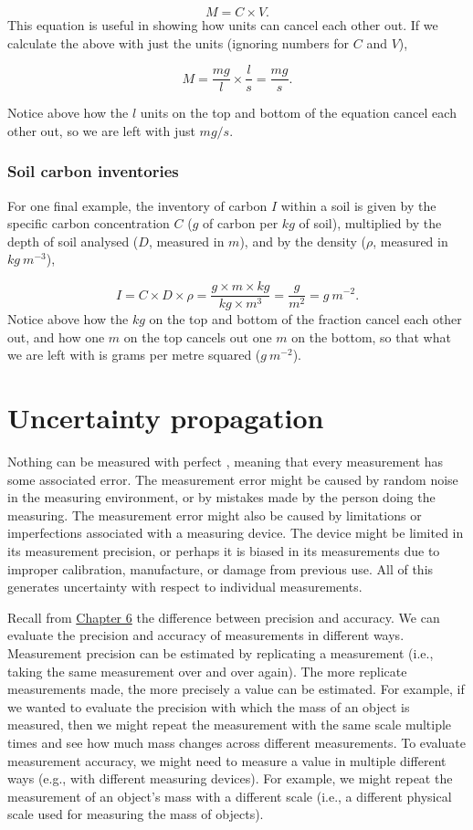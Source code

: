 \documentclass[
  openany]{krantz}
\begin{document}
\[M = C \times V.\]
This equation is useful in showing how units can cancel each other out.
If we calculate the above with just the units (ignoring numbers for \(C\) and \(V\)),

\[M = \frac{mg}{l} \times \frac{l}{s} = \frac{mg}{s}.\]

Notice above how the \(l\) units on the top and bottom of the equation cancel each other out, so we are left with just \(mg/s\).

\hypertarget{soil-carbon-inventories}{%
\subsection{Soil carbon inventories}\label{soil-carbon-inventories}}

For one final example, the inventory of carbon \(I\) within a soil is given by the specific carbon concentration \(C\) (\(g\) of carbon per \(kg\) of soil), multiplied by the depth of soil analysed (\(D\), measured in \(m\)), and by the density (\(\rho\), measured in \(kg\:m^{-3}\)),

\[I = C \times D \times \rho = \frac{g\times m \times kg}{kg \times m^{3}} = \frac{g}{m^{2}} = g\:m^{-2}.\]
Notice above how the \(kg\) on the top and bottom of the fraction cancel each other out, and how one \(m\) on the top cancels out one \(m\) on the bottom, so that what we are left with is grams per metre squared (\(g\:m^{-2}\)).

\hypertarget{Chapter_7}{%
\chapter{Uncertainty propagation}\label{Chapter_7}}

Nothing can be measured with perfect , meaning that every measurement has some associated error.
The measurement error might be caused by random noise in the measuring environment, or by mistakes made by the person doing the measuring.
The measurement error might also be caused by limitations or imperfections associated with a measuring device.
The device might be limited in its measurement precision, or perhaps it is biased in its measurements due to improper calibration, manufacture, or damage from previous use.
All of this generates uncertainty with respect to individual measurements.

Recall from \protect\hyperlink{Chapter_6}{Chapter 6} the difference between precision and accuracy.
We can evaluate the precision and accuracy of measurements in different ways.
Measurement precision can be estimated by replicating a measurement (i.e., taking the same measurement over and over again).
The more replicate measurements made, the more precisely a value can be estimated.
For example, if we wanted to evaluate the precision with which the mass of an object is measured, then we might repeat the measurement with the same scale multiple times and see how much mass changes across different measurements.
To evaluate measurement accuracy, we might need to measure a value in multiple different ways (e.g., with different measuring devices).
For example, we might repeat the measurement of an object's mass with a different scale (i.e., a different physical scale used for measuring the mass of objects).
\end{document}
